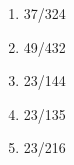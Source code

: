 \documentclass[12pt]{article}
\begin{document}
\begin{multicols}{2}
			\begin{enumerate}[label=(\alph*), noitemsep]
				\item {37}/{324}
				\item {49}/{432}
				\item {23}/{144}
				\item {23}/{135}
				\item {23}/{216}
			\end{enumerate}
		
		
	\end{multicols}
	
\end{document}
